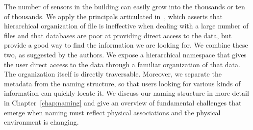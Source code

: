 The number of sensors in the building can easily grow into the thousands or ten of thousands.  We apply the principals articulated 
in~\cite{hierarchy_is_dead}, which asserts that hierarchical organization of file is ineffective when dealing with a large number of files
and that databases are poor at providing direct access to the data, but provide a good way to find the information we are looking for.
We combine these two, as suggested by the authors.  We expose a hierarchical namespace that gives the user direct access to the data
through a familiar organization of that data.  The organization itself is directly traversable.  Moreover, we separate the metadata from
the naming structure, so that users looking for various kinds of information can quickly locate it.
We discuss our naming structure in more detail in Chapter~\ref{chap:naming} and give an overview of fundamental challenges that emerge when
naming must reflect physical associations and the physical environment is changing.

